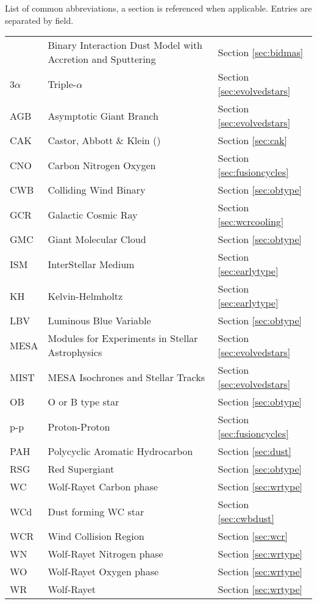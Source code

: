 \begin{abbreviations}
List of common abbreviations, a section is referenced when applicable. Entries are separated by field.

\begin{longtable}[c]{lll}
  \hline
  \endhead
  \hline
  \endfoot
    
  \multicolumn{3}{c}{\textbf{Physics}} \\
  \hline

  \bidmas{} & Binary Interaction Dust Model with Accretion and Sputtering & Section \ref{sec:bidmas} \\
  3$\alpha$ & Triple-$\alpha$ & Section \ref{sec:evolvedstars} \\
  AGB & Asymptotic Giant Branch & Section \ref{sec:evolvedstars} \\
  CAK & Castor, Abbott \& Klein (\citeyear{castor_radiation-driven_1975}) & Section \ref{sec:cak} \\
  CNO & Carbon Nitrogen Oxygen & Section \ref{sec:fusioncycles} \\ 
  CWB & Colliding Wind Binary  & Section \ref{sec:obtype} \\
  GCR & Galactic Cosmic Ray & Section \ref{sec:wcrcooling} \\
  GMC & Giant Molecular Cloud & Section \ref{sec:obtype}\\
  ISM & InterStellar Medium & Section \ref{sec:earlytype} \\
  KH  & Kelvin-Helmholtz & Section \ref{sec:earlytype} \\ 
  LBV & Luminous Blue Variable & Section \ref{sec:obtype} \\
  MESA & Modules for Experiments in Stellar Astrophysics & Section \ref{sec:evolvedstars} \\
  MIST & MESA Isochrones and Stellar Tracks & Section \ref{sec:evolvedstars} \\
  OB  & O or B type star & Section \ref{sec:obtype} \\ 
  p-p & Proton-Proton & Section \ref{sec:fusioncycles} \\ 
  PAH & Polycyclic Aromatic Hydrocarbon & Section \ref{sec:dust} \\
  RSG & Red Supergiant & Section \ref{sec:obtype} \\
  WC  & Wolf-Rayet Carbon phase & Section \ref{sec:wrtype} \\
  WCd & Dust forming WC star & Section \ref{sec:cwbdust} \\
  WCR & Wind Collision Region & Section \ref{sec:wcr} \\
  WN  & Wolf-Rayet Nitrogen phase & Section \ref{sec:wrtype} \\
  WO  & Wolf-Rayet Oxygen phase & Section \ref{sec:wrtype} \\
  WR  & Wolf-Rayet & Section \ref{sec:wrtype} \\


\end{longtable}
\end{abbreviations}
